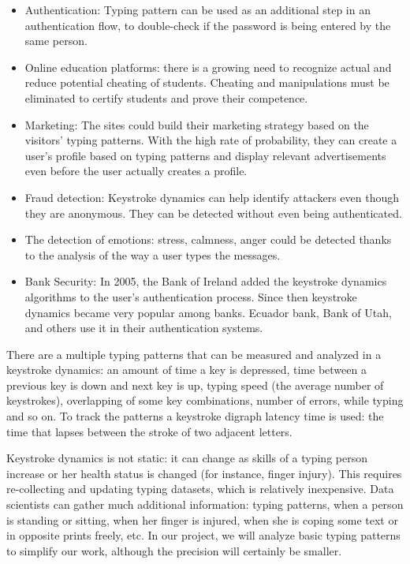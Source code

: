 \documentclass[12pt,a4]{article}
\begin{document}
\begin{itemize}
	\item Authentication: Typing pattern can be used as an additional step in an authentication flow, to double-check if the password is being entered by the same person.
	\item Online education platforms: there is a growing need to recognize actual and reduce potential cheating of students. Cheating and manipulations must be eliminated to certify students and prove their competence. 
	\item Marketing: The sites could build their marketing strategy based on the visitors' typing patterns. With the high rate of probability, they can create a user's profile based on typing patterns and display relevant advertisements even before the user actually creates a profile. 
	\item Fraud detection: Keystroke dynamics can help identify attackers even though they are anonymous. They can be detected without even being authenticated.
	\item The detection of emotions: stress, calmness, anger could be detected thanks to the analysis of the way a user types the messages. 
	\item Bank Security: In 2005, the Bank of Ireland added the keystroke dynamics algorithms to the user's authentication process. Since then keystroke dynamics became very popular among banks. Ecuador bank, Bank of Utah, and others use it in their authentication systems.
\end{itemize}	

There are a multiple typing patterns that can be measured and analyzed in a keystroke dynamics: an amount of time a key is depressed, time between a previous key is down and next key is up, typing speed (the average number of keystrokes), overlapping of some key combinations, number of errors, while typing and so on. To track the patterns a keystroke digraph latency time is used: the time that lapses between the stroke of two adjacent letters. 

Keystroke dynamics is not static: it can change as skills of a typing person increase or her health status is changed (for instance, finger injury). This requires re-collecting and updating typing datasets, which is relatively inexpensive. Data scientists can gather much additional information: typing patterns, when a person is standing or sitting, when her finger is injured, when she is coping some text or in opposite prints freely, etc. In our project, we will analyze basic typing patterns to simplify our work, although the precision will certainly be smaller.
\end{document}
